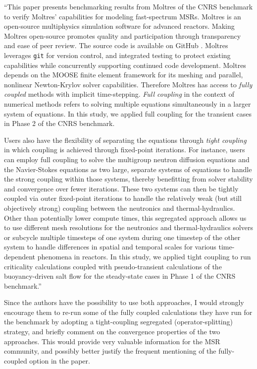 \documentclass[answers,11pt]{exam}
\begin{document}
\begin{questions}
\begin{solution}
        	``This paper presents benchmarking results from Moltres of the CNRS benchmark
to verify Moltres' capabilities for modeling fast-spectrum \glspl{MSR}. Moltres
is an open-source multiphysics simulation software for advanced reactors.
Making Moltres open-source promotes quality and participation through
transparency and ease of peer review. The source code
\cite{lindsay_moltres_2017} is available on GitHub \cite{github_build_2017}.
Moltres leverages \texttt{git} for version control, and integrated testing to
protect existing capabilities while concurrently supporting continued code
development. Moltres depends on the MOOSE finite element framework for
its meshing and parallel, nonlinear Newton-Krylov solver capabilities.
Therefore Moltres has access to \textit{fully coupled} methods with implicit
time-stepping. \textit{Full coupling} in the context of numerical methods
refers to solving multiple equations simultaneously in a larger system of
equations. In this study, we applied full coupling for the transient
cases in Phase 2 of the CNRS benchmark.

Users also have the flexibility of separating the equations through
\textit{tight coupling} in which coupling is achieved through
fixed-point iterations. For instance, users can employ full coupling to solve
the multigroup neutron diffusion equations and the Navier-Stokes equations as
two large, separate systems of equations to handle the strong coupling within
those systems, thereby benefitting from solver stability and convergence
over fewer iterations. These two systems can then be tightly coupled via outer
fixed-point iterations to handle the relatively weak (but still objectively
strong) coupling between the neutronics and thermal-hydraulics. Other than
potentially lower compute times, this segregated approach allows us to use
different mesh resolutions for the neutronics and thermal-hydraulics solvers
or subcycle multiple timesteps of one system during one timestep of the other
system to handle differences in spatial and temporal scales for various
time-dependent phenomena in reactors. In this study, we applied tight coupling
to run criticality calculations coupled with pseudo-transient calculations of
the buoyancy-driven salt flow for the steady-state cases in Phase 1 of the CNRS
benchmark.''
        \end{solution}
        
        \question Since the authors have the possibility to use both approaches, I would strongly encourage them to re-run some of the fully coupled calculations they have run for the benchmark by adopting a tight-coupling segregated (operator-splitting) strategy, and briefly comment on the convergence properties of the two approaches. This would provide very valuable information for the MSR community, and possibly better justify the
frequent mentioning of the fully-coupled option in the paper.


\end{questions}
\end{document}
